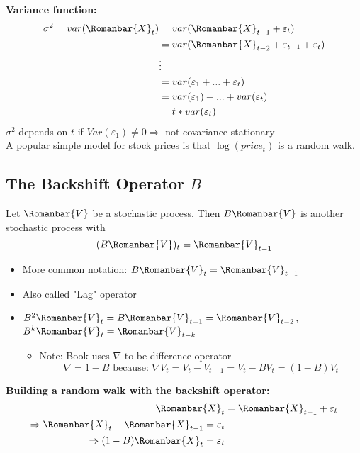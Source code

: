 \textbf{Variance function:}
\begin{align*}
    \sigma^2=var(\Romanbar{X}_t)&=var(\Romanbar{X}_{t-1} + \varepsilon_t)\\
    &=var(\Romanbar{X}_{t-2} + \varepsilon_{t-1} + \varepsilon_t) \\
    &\vdots \\
    &=var(\varepsilon_1+...+\varepsilon_t)\\
    &=var(\varepsilon_1)+...+var(\varepsilon_t)\\
    &=t * var(\varepsilon_t)
\end{align*}
$\sigma^2$ depends on $t$ if $Var(\varepsilon_1)\neq 0 \Rightarrow$ not covariance stationary \\

A popular simple model for stock prices is that $\log(price_t)$ is a random walk.

\subsection{The Backshift Operator $B$}

Let $\Romanbar{V}$ be a stochastic process. Then $B\Romanbar{V}$ is another stochastic process with \[(B\Romanbar{V})_t=\Romanbar{V}_{t-1}\]

\begin{itemize}
    \item More common notation: $B\Romanbar{V}_t=\Romanbar{V}_{t-1}$
    \item Also called "Lag" operator 
    \item $B^2\Romanbar{V}_t=B\Romanbar{V}_{t-1}=\Romanbar{V}_{t-2}$, \quad $B^k\Romanbar{V}_t=\Romanbar{V}_{t-k}$
    \begin{itemize}
        \item[] Note: Book uses $\nabla$ to be difference operator 
        \[ \nabla=1-B \text{ because: } \nabla V_t = V_t-V_{t-1}=V_t-BV_t=(1-B)V_t\]
    \end{itemize}
\end{itemize}

\textbf{Building a random walk with the backshift operator:}
\begin{align*}
    \Romanbar{X}_t&=\Romanbar{X}_{t-1}+\varepsilon_t\\
    \Rightarrow \Romanbar{X}_t-\Romanbar{X}_{t-1}=\varepsilon_t\\
    \Rightarrow(1-B)\Romanbar{X}_t=\varepsilon_t
\end{align*}


